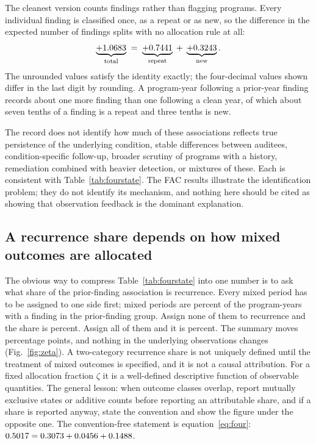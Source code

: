 The cleanest version counts findings rather than flagging programs. Every
individual finding is classified once, as a repeat or as new, so the
difference in the expected number of findings splits with no allocation rule
at all:
%
\begin{equation}\label{eq:count}
  \underbrace{+1.0683{}}_{\text{total}}
  \;=\;
  \underbrace{+0.7441{}}_{\text{repeat}}
  \;+\;
  \underbrace{+0.3243{}}_{\text{new}} .
\end{equation}
%
The unrounded values satisfy the identity exactly; the four-decimal values
shown differ in the last digit by rounding. A program-year following a
prior-year finding records about one more finding than one following a clean
year, of which about seven tenths of a finding is a repeat and three tenths is
new.

The record does not identify how much of these associations reflects true
persistence of the underlying condition, stable differences between auditees,
condition-specific follow-up, broader scrutiny of programs with a history,
remediation combined with heavier detection, or mixtures of these. Each is
consistent with Table~\ref{tab:fourstate}. The FAC results illustrate the
identification problem; they do not identify its mechanism, and nothing here
should be cited as showing that observation feedback is the dominant
explanation.

\subsection{A recurrence share depends on how mixed outcomes are allocated}

The obvious way to compress Table~\ref{tab:fourstate} into one number is to
ask what share of the prior-finding association is recurrence. Every mixed
period has to be assigned to one side first; mixed periods are
\nMixedShare{} percent of the program-years with a finding in the
prior-finding group. Assign none of them to recurrence and the share is
\nZetaLo{} percent. Assign all of them and it is \nZetaHi{} percent. The
summary moves \nZetaSwing{} percentage points, and nothing in the underlying
observations changes (Fig.~\ref{fig:zeta}). A two-category recurrence share
is not uniquely defined until the treatment of mixed outcomes is specified,
and it is not a causal attribution. For a fixed allocation fraction $\zeta$ it
is a well-defined descriptive function of observable quantities. The general
lesson: when outcome classes overlap, report mutually exclusive states
or additive counts before reporting an attributable share, and if a share is
reported anyway, state the convention and show the figure under the opposite
one. The convention-free statement is equation~\eqref{eq:four}:
$0.5017{} = 0.3073{} + 0.0456{} + 0.1488{}$.

